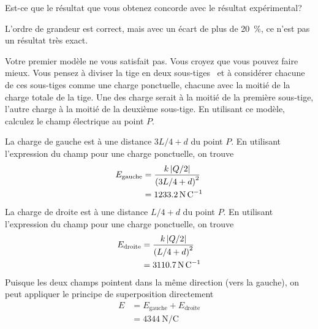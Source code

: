 Est-ce que le résultat que vous obtenez concorde avec le résultat expérimental?

\begin{reponsebox}
  L'ordre de grandeur est correct, mais avec un écart de plus de
  \SI{20}{\percent}, ce n'est pas un résultat très exact.
\end{reponsebox}




Votre premier modèle ne vous satisfait pas. Vous croyez que vous pouvez faire
mieux. Vous pensez à diviser la tige en deux \og sous-tiges \fg\ et à
considérer chacune de ces sous-tiges comme une charge ponctuelle, chacune avec
la moitié de la charge totale de la tige. Une des charge serait à la moitié de
la première sous-tige, l'autre charge à la moitié de la deuxième sous-tige.
En utilisant ce modèle, calculez le champ électrique au point $P$.


\begin{reponsebox}
  La charge de gauche est à une distance $3L/4 + d$ du point $P$. En utilisant
  l'expression du champ pour une charge ponctuelle, on trouve
  \begin{align*}
    E_\mathrm{gauche} &= \frac{k\left| Q/2 \right|}{\left(3L/4 + d\right)^2}  \\
      &= \SI{1233.2}{\newton\per\coulomb}
  \end{align*}
  La charge de droite est à une distance $L/4 + d$ du point $P$. En utilisant
  l'expression du champ pour une charge ponctuelle, on trouve
  \begin{align*}
    E_\mathrm{droite} &= \frac{k\left| Q/2 \right|}{\left(L/4 + d\right)^2}  \\
      &= \SI{3110.7}{\newton\per\coulomb}
  \end{align*}
  Puisque les deux champs pointent dans la même direction (vers la gauche), on
  peut appliquer le principe de superposition directement
  \begin{align*}
    E &= E_\mathrm{gauche} + E_\mathrm{droite}  \\
      &= \SI{4344}{\newton\per\coulomb}
  \end{align*}
\end{reponsebox}

